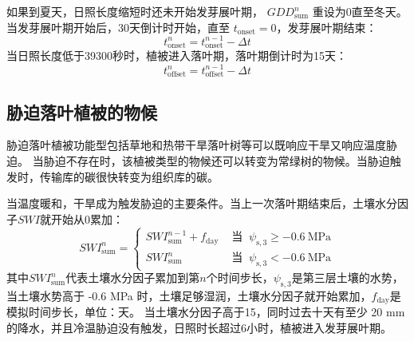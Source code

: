 如果到夏天，日照长度缩短时还未开始发芽展叶期，
$GDD_{\mathrm{sum}}^n$ 重设为0直至冬天。当发芽展叶期开始后，30天倒计时开始，直至 $t_{\mathrm{onset}}=0$，发芽展叶期结束：
%
\begin{equation}
  t_{\mathrm{onset}}^n=t_{\mathrm{onset}}^{n-1}-\Delta t
\end{equation}
当日照长度低于39300秒时，植被进入落叶期，落叶期倒计时为15天：
\begin{equation}
  t_{\mathrm{offset}}^n=t_{\mathrm{offset}}^{n-1}-\Delta t
\end{equation}


\subsection{胁迫落叶植被的物候}

胁迫落叶植被功能型包括草地和热带干旱落叶树等可以既响应干旱又响应温度胁迫。
当胁迫不存在时，该植被类型的物候还可以转变为常绿树的物候。当胁迫触发时，传输库的碳很快转变为组织库的碳。


当温度暖和，干旱成为触发胁迫的主要条件。当上一次落叶期结束后，土壤水分因子$SWI$就开始从0累加：
\begin{equation}
  SWI_{\mathrm{sum}}^{n}=\left\{\begin{array}{ll}SWI_{\mathrm{sum}}^{n-1}+f_{\mathrm{d a y}} & \text{ 当 }\ \psi_{\mathrm{s, 3}} \geqslant -0.6\ \mathrm{MPa} \\
      SWI_{\mathrm{sum}}^{n} &  \text{ 当 }\ \psi_{\mathrm{s, 3}}<-0.6\ \mathrm{MPa}
  \end{array}\right.
\end{equation}
其中$SWI_{\mathrm{sum}}^n$代表土壤水分因子累加到第$n$个时间步长，$\psi_{\mathrm{s,3}}$是第三层土壤的水势，当土壤水势高于 -0.6 MPa 时，土壤足够湿润，土壤水分因子就开始累加，$f_{\mathrm{d a y}}$是模拟时间步长，单位：天。
当土壤水分因子高于15，同时过去十天有至少 20 mm 的降水，并且冷温胁迫没有触发，日照时长超过6小时，植被进入发芽展叶期。


